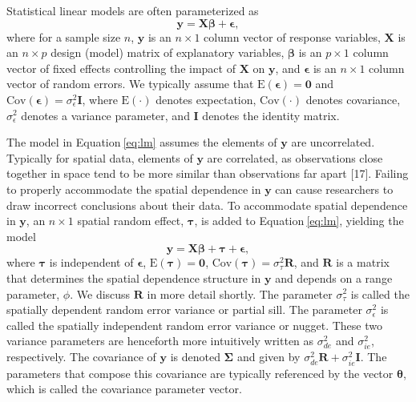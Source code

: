 \documentclass[10pt,letterpaper]{article}
\begin{document}
Statistical linear models are often parameterized as
\begin{equation}\label{eq:lm}
 \mathbf{y} = \mathbf{X} \boldsymbol{\beta} + \boldsymbol{\epsilon},
\end{equation} where for a sample size \(n\), \(\mathbf{y}\) is an
\(n \times 1\) column vector of response variables, \(\mathbf{X}\) is an
\(n \times p\) design (model) matrix of explanatory variables,
\(\boldsymbol{\beta}\) is an \(p \times 1\) column vector of fixed
effects controlling the impact of \(\mathbf{X}\) on \(\mathbf{y}\), and
\(\boldsymbol{\epsilon}\) is an \(n \times 1\) column vector of random
errors. We typically assume that
\(\text{E}(\boldsymbol{\epsilon}) = \mathbf{0}\) and
\(\text{Cov}(\boldsymbol{\epsilon}) = \sigma^2_\epsilon \mathbf{I}\),
where \(\text{E}(\cdot)\) denotes expectation, \(\text{Cov}(\cdot)\)
denotes covariance, \(\sigma^2_\epsilon\) denotes a variance parameter,
and \(\mathbf{I}\) denotes the identity matrix.

The model in Equation\(~\)\ref{eq:lm} assumes the elements of
\(\mathbf{y}\) are uncorrelated. Typically for spatial data, elements of
\(\mathbf{y}\) are correlated, as observations close together in space
tend to be more similar than observations far apart {[}17{]}. Failing to
properly accommodate the spatial dependence in \(\mathbf{y}\) can cause
researchers to draw incorrect conclusions about their data. To
accommodate spatial dependence in \(\mathbf{y}\), an \(n \times 1\)
spatial random effect, \(\boldsymbol{\tau}\), is added to
Equation\(~\)\ref{eq:lm}, yielding the model
\begin{equation}\label{eq:splm}
 \mathbf{y} = \mathbf{X} \boldsymbol{\beta} + \boldsymbol{\tau} + \boldsymbol{\epsilon},
\end{equation} where \(\boldsymbol{\tau}\) is independent of
\(\boldsymbol{\epsilon}\), \(\text{E}(\boldsymbol{\tau}) = \mathbf{0}\),
\(\text{Cov}(\boldsymbol{\tau}) = \sigma^2_\tau \mathbf{R}\), and
\(\mathbf{R}\) is a matrix that determines the spatial dependence
structure in \(\mathbf{y}\) and depends on a range parameter, \(\phi\).
We discuss \(\mathbf{R}\) in more detail shortly. The parameter
\(\sigma^2_\tau\) is called the spatially dependent random error
variance or partial sill. The parameter \(\sigma^2_\epsilon\) is called
the spatially independent random error variance or nugget. These two
variance parameters are henceforth more intuitively written as
\(\sigma^2_{de}\) and \(\sigma^2_{ie}\), respectively. The covariance of
\(\mathbf{y}\) is denoted \(\boldsymbol{\Sigma}\) and given by
\(\sigma^2_{de} \mathbf{R} + \sigma^2_{ie} \mathbf{I}\). The parameters
that compose this covariance are typically referenced by the vector
\(\boldsymbol{\theta}\), which is called the covariance parameter
vector.
\end{document}
